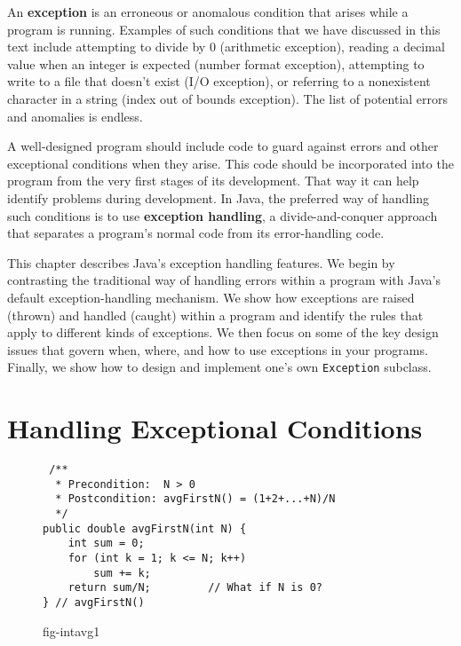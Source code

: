 An {\bf exception} is an erroneous or anomalous
condition that arises  while a program is
running. Examples of such conditions that we have discussed in this
text include attempting to divide by 0 (arithmetic exception), reading
a decimal value when an integer is expected (number format exception),
attempting to write to a file that doesn't exist (I/O exception), or
referring to a nonexistent character in a string (index out of bounds
exception).  The list of potential errors and anomalies is endless.

A well-designed program should include code to guard against errors
and other exceptional conditions when they arise.  This code should be
incorporated into the program from the very first stages of its
development.  That way it can help identify problems during
development. In Java, the preferred way of handling such conditions is
to use {\bf exception handling}, a 
divide-and-conquer approach that separates a program's normal code 
from its error-handling code.


This chapter describes Java's exception handling features.  We begin
by contrasting the traditional way of handling errors within a program
with Java's default exception-handling mechanism.  We show how
exceptions are raised (thrown) and handled (caught) within a program
and identify the rules that apply to different kinds of exceptions.
We then focus on some of the key design issues that govern when,
where, and how to use exceptions in your programs.  Finally, we show
how to design and implement one's own {\tt Exception} subclass.

\section{Handling Exceptional Conditions}

\begin{figure}[b]
\jjjprogstart
\begin{jjjlisting}
\begin{lstlisting}
 /**
  * Precondition:  N > 0
  * Postcondition: avgFirstN() = (1+2+...+N)/N
  */
public double avgFirstN(int N) {
    int sum = 0;
    for (int k = 1; k <= N; k++)
        sum += k;
    return sum/N;         // What if N is 0?
} // avgFirstN()
\end{lstlisting}
\end{jjjlisting}
{fig-intavg1}
\end{figure}

